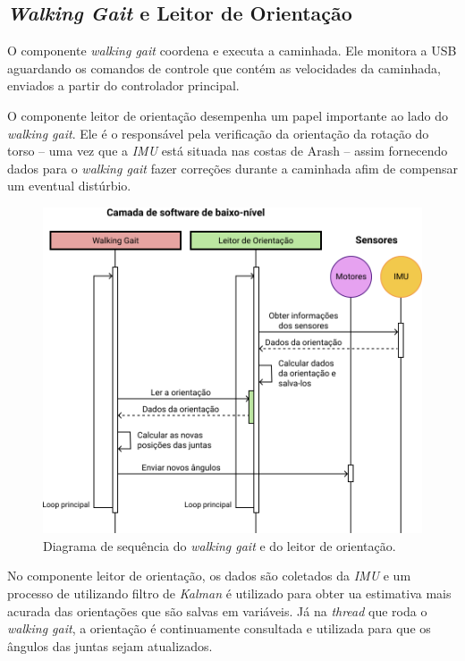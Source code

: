\subsection{\textit{Walking Gait} e Leitor de Orientação}

O componente \textit{walking gait} coordena e executa a caminhada. Ele monitora a USB aguardando os comandos de controle que contém as velocidades da caminhada, enviados a partir do controlador principal.

O componente leitor de orientação desempenha um papel importante ao lado do \textit{walking gait}. Ele é o responsável pela verificação da orientação da rotação do torso -- uma vez que a \textit{IMU} está situada nas costas de Arash -- assim fornecendo dados para o \textit{walking gait} fazer correções durante a caminhada afim de compensar um eventual distúrbio.

\begin{figure}[htb]
	\centering
	\includegraphics[scale=0.8]{imagens/svg/softwarearchitecture-lowlevel}
	\caption{Diagrama de sequência do \textit{walking gait} e do leitor de orientação.}
	\label{fig:softwarearchitecture:lowlevel}
\end{figure}

No componente leitor de orientação, os dados são coletados da \textit{IMU} e um processo de utilizando filtro de \textit{Kalman} é utilizado para obter ua estimativa mais acurada das orientações que são salvas em variáveis. Já na \textit{thread} que roda o \textit{walking gait}, a orientação é continuamente consultada e utilizada para que os ângulos das juntas sejam atualizados.

